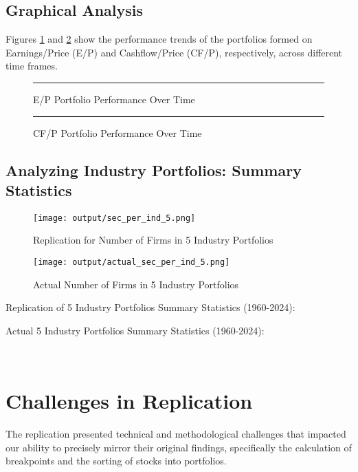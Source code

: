 \documentclass{article}
\begin{document}
\subsection*{Graphical Analysis}

Figures \ref{fig:graph1} and \ref{fig:graph2} show the performance trends of the portfolios formed on Earnings/Price (E/P) and Cashflow/Price (CF/P), respectively, across different time frames.

\begin{figure}[ht]
\centering
\rule{0.8\textwidth}{0.4\textwidth} %
\caption{E/P Portfolio Performance Over Time}
\label{fig:graph1}
\end{figure}

\begin{figure}[ht]
\centering
\rule{0.8\textwidth}{0.4\textwidth} %
\caption{CF/P Portfolio Performance Over Time}
\label{fig:graph2}
\end{figure}

\subsection*{Analyzing Industry Portfolios: Summary Statistics}
\begin{figure}[]
  \centering
  \texttt{[image: output/sec\_per\_ind\_5.png]}
  \caption{Replication for Number of Firms in 5 Industry Portfolios}
  \texttt{[image: output/actual\_sec\_per\_ind\_5.png]}
  \caption{Actual Number of Firms in 5 Industry Portfolios}
\end{figure}

\pagebreak
Replication of 5 Industry Portfolios Summary Statistics (1960-2024):\\
\begin{center}
  
\end{center}

Actual 5 Industry Portfolios Summary Statistics (1960-2024):
\begin{center}
  \\  
\end{center}



\section*{Challenges in Replication}

The replication presented technical and methodological challenges that impacted our ability to precisely mirror their original findings, specifically the calculation of breakpoints and the sorting of stocks into portfolios.
\end{document}
